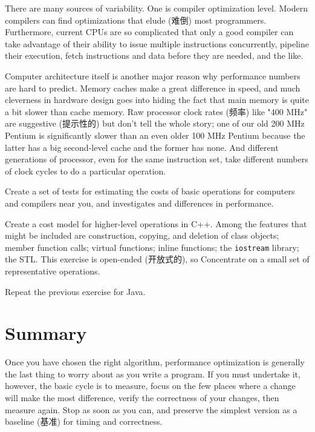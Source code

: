 There are many sources of variability. One is compiler optimization level.
Modern compilers can find optimizations that elude (难倒) most programmers.
Furthermore, current CPUs are so complicated that only a good compiler can
take advantage of their ability to issue multiple instructions
concurrently, pipeline their execution, fetch instructions and data before
they are needed, and the like.

Computer architecture itself is another major reason why performance
numbers are hard to predict. Memory caches make a great difference in
speed, and much cleverness in hardware design goes into hiding the fact
that main memory is quite a bit slower than cache memory. Raw processor
clock rates (频率) like "400 MHz" are suggestive (提示性的) but don't tell
the whole story; one of our old 200 MHz Pentium is significantly slower
than an even older 100 MHz Pentium because the latter has a big
second-level cache and the former has none. And different generations of
processor, even for the same instruction set, take different numbers of
clock cycles to do a particular operation.

\begin{exercise}
    Create a set of tests for estimating the costs of basic operations for
    computers and compilers near you, and investigates and differences in
    performance.
\end{exercise}

\begin{exercise}
    \label{exer:cpp_cost_model}
    Create a cost model for higher-level operations in C++. Among the
    features that might be included are construction, copying, and deletion
    of class objects; member function calls; virtual functions; inline
    functions; the \verb'iostream' library; the STL. This exercise is
    open-ended (开放式的), so Concentrate on a small set of representative
    operations.
\end{exercise}

\begin{exercise}
    \label{exer:java_cost_model}
    Repeat the previous exercise for Java.
\end{exercise}

\section{Summary}

Once you have chosen the right algorithm, performance optimization is
generally the last thing to worry about as you write a program. If you must
undertake it, however, the basic cycle is to measure, focus on the few
places where a change will make the most difference, verify the correctness
of your changes, then measure again. Stop as soon as you can, and preserve
the simplest version as a baseline (基准) for timing and correctness.

